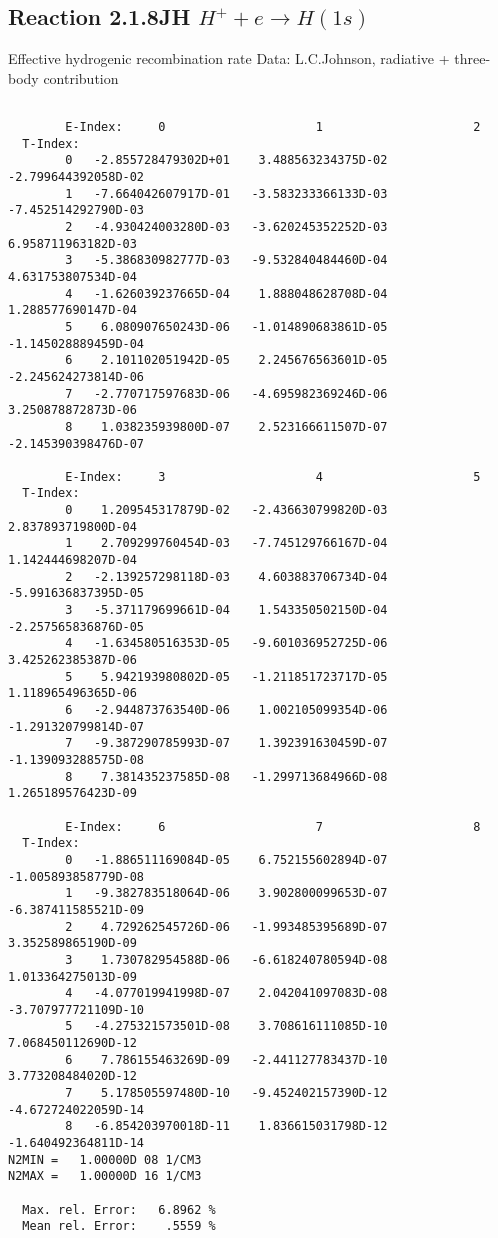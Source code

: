 \documentclass[12pt,dvipdfmx]{article}
\begin{document}
\subsection{
  Reaction 2.1.8JH  $ H^+ + e\rightarrow H(1s) $
}

   Effective hydrogenic recombination rate
   Data: L.C.Johnson, radiative + three-body contribution


\begin{small}\begin{verbatim}

        E-Index:     0                     1                     2
  T-Index:
        0   -2.855728479302D+01    3.488563234375D-02   -2.799644392058D-02
        1   -7.664042607917D-01   -3.583233366133D-03   -7.452514292790D-03
        2   -4.930424003280D-03   -3.620245352252D-03    6.958711963182D-03
        3   -5.386830982777D-03   -9.532840484460D-04    4.631753807534D-04
        4   -1.626039237665D-04    1.888048628708D-04    1.288577690147D-04
        5    6.080907650243D-06   -1.014890683861D-05   -1.145028889459D-04
        6    2.101102051942D-05    2.245676563601D-05   -2.245624273814D-06
        7   -2.770717597683D-06   -4.695982369246D-06    3.250878872873D-06
        8    1.038235939800D-07    2.523166611507D-07   -2.145390398476D-07

        E-Index:     3                     4                     5
  T-Index:
        0    1.209545317879D-02   -2.436630799820D-03    2.837893719800D-04
        1    2.709299760454D-03   -7.745129766167D-04    1.142444698207D-04
        2   -2.139257298118D-03    4.603883706734D-04   -5.991636837395D-05
        3   -5.371179699661D-04    1.543350502150D-04   -2.257565836876D-05
        4   -1.634580516353D-05   -9.601036952725D-06    3.425262385387D-06
        5    5.942193980802D-05   -1.211851723717D-05    1.118965496365D-06
        6   -2.944873763540D-06    1.002105099354D-06   -1.291320799814D-07
        7   -9.387290785993D-07    1.392391630459D-07   -1.139093288575D-08
        8    7.381435237585D-08   -1.299713684966D-08    1.265189576423D-09

        E-Index:     6                     7                     8
  T-Index:
        0   -1.886511169084D-05    6.752155602894D-07   -1.005893858779D-08
        1   -9.382783518064D-06    3.902800099653D-07   -6.387411585521D-09
        2    4.729262545726D-06   -1.993485395689D-07    3.352589865190D-09
        3    1.730782954588D-06   -6.618240780594D-08    1.013364275013D-09
        4   -4.077019941998D-07    2.042041097083D-08   -3.707977721109D-10
        5   -4.275321573501D-08    3.708616111085D-10    7.068450112690D-12
        6    7.786155463269D-09   -2.441127783437D-10    3.773208484020D-12
        7    5.178505597480D-10   -9.452402157390D-12   -4.672724022059D-14
        8   -6.854203970018D-11    1.836615031798D-12   -1.640492364811D-14
N2MIN =   1.00000D 08 1/CM3
N2MAX =   1.00000D 16 1/CM3

  Max. rel. Error:   6.8962 %
  Mean rel. Error:    .5559 %


\end{verbatim}\end{small}
\end{document}
